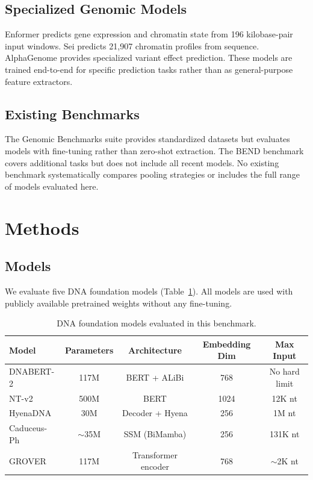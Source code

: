 \documentclass[11pt]{article}
\begin{document}
\subsection{Specialized Genomic Models}
Enformer \citep{avsec2021enformer} predicts gene expression and chromatin state from 196 kilobase-pair input windows. Sei \citep{chen2022sei} predicts 21,907 chromatin profiles from sequence. AlphaGenome provides specialized variant effect prediction. These models are trained end-to-end for specific prediction tasks rather than as general-purpose feature extractors.

\subsection{Existing Benchmarks}
The Genomic Benchmarks suite \citep{gresova2023genomic} provides standardized datasets but evaluates models with fine-tuning rather than zero-shot extraction. The BEND benchmark \citep{marin2024bend} covers additional tasks but does not include all recent models. No existing benchmark systematically compares pooling strategies or includes the full range of models evaluated here.

\section{Methods}

\subsection{Models}
We evaluate five DNA foundation models (Table~\ref{tab:models}). All models are used with publicly available pretrained weights without any fine-tuning.

\begin{table}[h]
\centering
\caption{DNA foundation models evaluated in this benchmark.}
\label{tab:models}
\begin{tabular}{lcccc}
\toprule
Model & Parameters & Architecture & Embedding Dim & Max Input \\
\midrule
DNABERT-2 & 117M & BERT + ALiBi & 768 & No hard limit \\
NT-v2 & 500M & BERT & 1024 & 12K nt \\
HyenaDNA & 30M & Decoder + Hyena & 256 & 1M nt \\
Caduceus-Ph & $\sim$35M & SSM (BiMamba) & 256 & 131K nt \\
GROVER & 117M & Transformer encoder & 768 & $\sim$2K nt \\
\bottomrule
\end{tabular}
\end{table}
\end{document}
